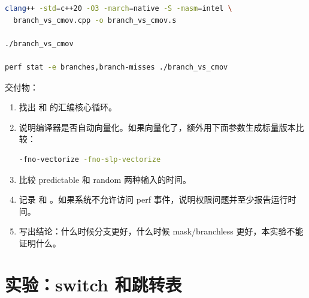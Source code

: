 \begin{labbox}
\begin{lstlisting}[language=bash]
clang++ -std=c++20 -O3 -march=native -S -masm=intel \
  branch_vs_cmov.cpp -o branch_vs_cmov.s

./branch_vs_cmov

perf stat -e branches,branch-misses ./branch_vs_cmov
\end{lstlisting}

交付物：

\begin{enumerate}
  \item 找出  和  的汇编核心循环。
  \item 说明编译器是否自动向量化。如果向量化了，额外用下面参数生成标量版本比较：
\begin{lstlisting}[language=bash]
-fno-vectorize -fno-slp-vectorize
\end{lstlisting}
  \item 比较 predictable 和 random 两种输入的时间。
  \item 记录  和 。如果系统不允许访问 perf 事件，说明权限问题并至少报告运行时间。
  \item 写出结论：什么时候分支更好，什么时候 mask/branchless 更好，本实验不能证明什么。
\end{enumerate}
\end{labbox}

\section{实验：switch 和跳转表}


